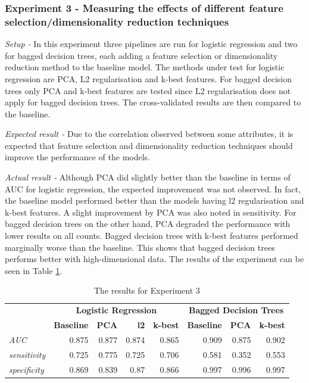 \documentclass{article}[paper=a4,pagesize=auto,10pt]
\begin{document}
\subsubsection{Experiment 3 - Measuring the effects of different feature selection/dimensionality reduction techniques}

\textit{Setup -} In this experiment three pipelines are run for logistic regression and two for bagged decision trees, each adding a feature selection or dimensionality reduction method to the baseline model. The methods under test for logistic regression are PCA, L2 regularisation and k-best features. For bagged decision trees only PCA and k-best features are tested since L2 regularisation does not apply for bagged decision trees. The cross-validated results are then compared to the baseline.
\smallskip

\textit{Expected result -} Due to the correlation observed between some attributes, it is expected that feature selection and dimensionality reduction techniques should improve the performance of the models.
\smallskip

\textit{Actual result -} Although PCA did slightly better than the baseline in terms of AUC for logistic regression, the expected improvement was not observed. In fact, the baseline model performed better than the models having l2 regularisation and k-best features. A slight improvement by PCA was also noted in sensitivity. For bagged decision trees on the other hand, PCA degraded the performance with lower results on all counts. Bagged decision trees with k-best features performed marginally worse than the baseline. This shows that bagged decision trees performs better with high-dimensional data. The results of the experiment can be seen in Table \ref{tab:lr3}.


\begin{table}[ht!]
\begin{tabular}{lrrrr|rrr}
\toprule
 & \multicolumn{4}{c|}{\textbf{Logistic Regression}} & \multicolumn{3}{c}{\textbf{Bagged Decision Trees}} \\
 & \textbf{Baseline} & \textbf{PCA} & \textbf{l2} & \textbf{k-best} & \textbf{Baseline} & \textbf{PCA} & \textbf{k-best} \\
\midrule
\textit{AUC} & 0.875 & 0.877 & 0.874 & 0.865 & 0.909 & 0.875 & 0.902 \\
\textit{sensitivity} & 0.725 & 0.775 & 0.725 & 0.706 & 0.581 & 0.352 & 0.553 \\
\textit{specificity} & 0.869 & 0.839 & 0.87 & 0.866 & 0.997 & 0.996 & 0.997 \\
\bottomrule
\end{tabular}
\caption{The results for Experiment 3}
\label{tab:lr3}
\end{table}
\end{document}
